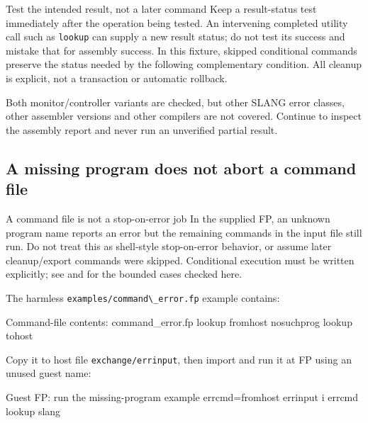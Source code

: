 \begin{operationnote}{Test the intended result, not a later command}
Keep a result-status test immediately after the operation being tested. An intervening completed utility call such as \passthrough{\lstinline!lookup!} can supply a new result status; do not test its success and mistake that for assembly success. In this fixture, skipped conditional commands preserve the status needed by the following complementary condition. All cleanup is explicit, not a transaction or automatic rollback.
\end{operationnote}

Both monitor/controller variants are checked, but other SLANG error classes, other assembler versions and other compilers are not covered. Continue to inspect the assembly report and never run an unverified partial result.

\subsection{A missing program does not abort a command file}\label{a-missing-program-does-not-abort-a-command-file}

\begin{operationnote}{A command file is not a stop-on-error job}
In the supplied FP, an unknown program name reports an error but the remaining commands in the input file still run. Do not treat this as shell-style stop-on-error behavior, or assume later cleanup/export commands were skipped. Conditional execution must be written explicitly; see  and  for the bounded cases checked here.
\end{operationnote}

The harmless \passthrough{\lstinline!examples/command\_error.fp!} example contains:

\begin{commandexample}{Command-file contents: command\_error.fp}
lookup fromhost
nosuchprog
lookup tohost
\end{commandexample}

Copy it to host file \passthrough{\lstinline!exchange/errinput!}, then import and run it at FP using an unused guest name:

\begin{commandexample}{Guest FP: run the missing-program example}
errcmd=fromhost errinput
i errcmd
lookup slang
\end{commandexample}

